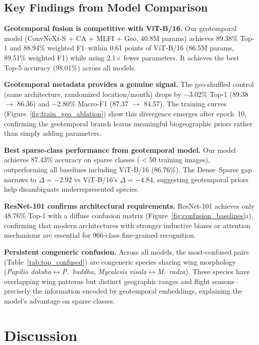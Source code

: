 \documentclass[11pt]{article}
\begin{document}
\subsection{Key Findings from Model Comparison}

\textbf{Geotemporal fusion is competitive with ViT-B/16.} Our geotemporal model (ConvNeXt-S + CA + MLFI + Geo, 40.8M params) achieves 89.38\% Top-1 and 88.94\% weighted F1--within 0.61 points of ViT-B/16 (86.5M params, 89.51\% weighted F1) while using 2.1$\times$ fewer parameters. It achieves the best Top-5 accuracy (98.01\%) across all models.

\textbf{Geotemporal metadata provides a genuine signal.} The geo-shuffled control (same architecture, randomized location/month) drops by $-$3.02\% Top-1 (89.38 $\to$ 86.36) and $-$2.80\% Macro-F1 (87.37 $\to$ 84.57). The training curves (Figure~\ref{fig:train_geo_ablation}) show this divergence emerges after epoch~10, confirming the geotemporal branch learns meaningful biogeographic priors rather than simply adding parameters.

\textbf{Best sparse-class performance from geotemporal model.} Our model achieves 87.43\% accuracy on sparse classes ($<$50 training images), outperforming all baselines including ViT-B/16 (86.76\%). The Dense--Sparse gap narrows to $\Delta = -2.92$ vs ViT-B/16's $\Delta = -4.84$, suggesting geotemporal priors help disambiguate underrepresented species.

\textbf{ResNet-101 confirms architectural requirements.} ResNet-101 achieves only 48.76\% Top-1 with a diffuse confusion matrix (Figure~\ref{fig:confusion_baselines}a), confirming that modern architectures with stronger inductive biases or attention mechanisms are essential for 966-class fine-grained recognition.

\textbf{Persistent congeneric confusion.} Across all models, the most-confused pairs (Table~\ref{tab:top_confused}) are congeneric species sharing wing morphology (\emph{Papilio daksha}$\leftrightarrow$\emph{P.~buddha}, \emph{Mycalesis visala}$\leftrightarrow$\emph{M.~radza}). These species have overlapping wing patterns but distinct geographic ranges and flight seasons--precisely the information encoded by geotemporal embeddings, explaining the model's advantage on sparse classes.

\section{Discussion}
\end{document}
